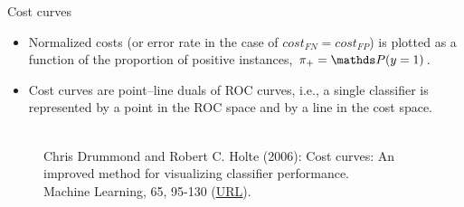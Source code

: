 
\begin{vbframe}{Cost curves}

\begin{footnotesize}

\begin{itemize}
  \item Normalized costs (or error rate in the case of
  $cost_{FN} = cost_{FP}$) is plotted as a function of the proportion of
  positive instances, $\rp = \P(y = 1)$.
  \item Cost curves are point–line duals of ROC curves, i.e., a single
  classifier is represented by a point in the ROC space and by a line in the
  cost space.
\end{itemize}

\end{footnotesize}

\begin{figure}
  \centering
  \tiny
  \\Chris Drummond and Robert C. Holte (2006): Cost curves: An improved
  method for visualizing classifier performance. \\Machine Learning, 65, 95-130
  (\href{https://www.semanticscholar.org/paper/Cost-curves\%3A-An-improved-method-for  -visualizing-Drummond-Holte/71708ce984e0896e7383435913547e770572410e}
  {\underline{URL}}).
\end{figure}


\end{vbframe}


